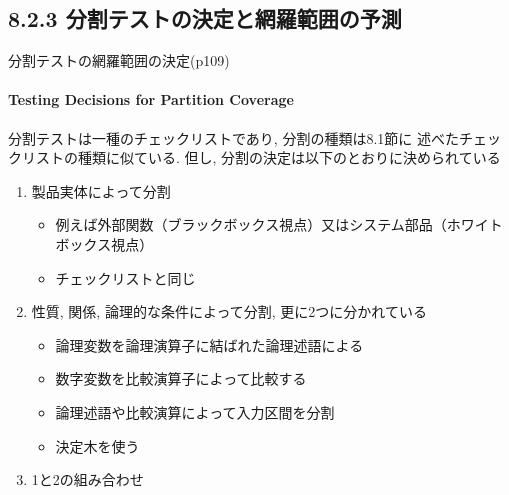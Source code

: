 \subsection{8.2.3 分割テストの決定と網羅範囲の予測}
\begin{frame}{分割テストの網羅範囲の決定(p109)}
\framesubtitle{Testing Decisions for Partition Coverage}
分割テストは一種のチェックリストであり, 分割の種類は8.1節に
述べたチェックリストの種類に似ている. 
但し, 分割の決定は以下のとおりに決められている
\begin{enumerate}
\item 製品実体によって分割
    \begin{itemize}
    \item 例えば外部関数（ブラックボックス視点）又はシステム部品（ホワイトボックス視点）
    \item<uncover@2-|alert@2>
    チェックリストと同じ
    \end{itemize}
\item 性質, 関係, 論理的な条件によって分割, 更に2つに分かれている
    \begin{itemize}
    \item 論理変数を論理演算子に結ばれた論理述語による 
    \item 数字変数を比較演算子によって比較する
    \item<uncover@3-|alert@3>
    論理述語や比較演算によって入力区間を分割
    \item<uncover@4-|alert@4>
    決定木を使う
    \end{itemize}
\item 1と2の組み合わせ 
\end{enumerate}
\end{frame}
